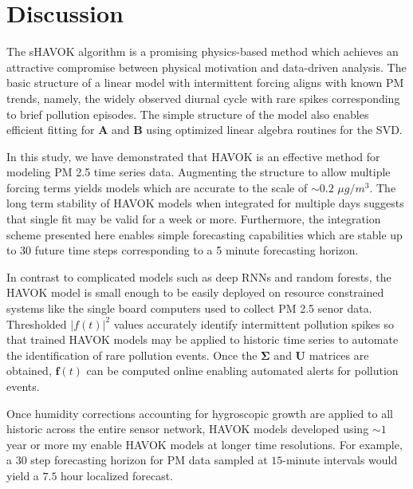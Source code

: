 \section{Discussion}

The sHAVOK algorithm is a promising physics-based method which achieves an
attractive compromise between physical motivation and data-driven analysis.
The basic structure of a linear model with intermittent
forcing aligns with known PM trends, namely, the widely observed diurnal cycle
with rare spikes corresponding to brief pollution episodes. The simple structure
of the model also enables efficient fitting for $\mathbf{A}$ and $\mathbf{B}$
using optimized linear algebra routines for the SVD.

In this study, we have demonstrated that HAVOK is an effective method for
modeling PM 2.5 time series data. Augmenting the structure to allow multiple
forcing terms yields models which are accurate to the scale of $\sim
0.2$ $\mu g/m^3$. The long term stability of HAVOK models when integrated for multiple
days suggests that single fit may be valid for a week or more. Furthermore, the
integration scheme presented here enables simple forecasting capabilities which
are stable up to 30 future time steps corresponding to a 5 minute forecasting
horizon.

In contrast to complicated models such as deep RNNs and random forests, the
HAVOK model is small enough to be easily deployed on resource constrained
systems like the single board computers used to collect PM 2.5 senor data.
Thresholded $\lvert  f(t) \rvert^2$ values accurately identify intermittent
pollution spikes so that trained HAVOK models may be applied to historic
time series to automate the identification of rare pollution events. Once the
$\mathbf{\Sigma}$ and $\mathbf{U}$ matrices are obtained, $\mathbf{f}(t)$
can be computed online enabling automated alerts for pollution events.

Once humidity corrections accounting for hygroscopic growth are applied to all
historic across the entire sensor network, HAVOK models developed using $\sim$$1$
year or more my enable HAVOK models at longer time resolutions. For example, a
30 step forecasting horizon for PM data sampled at $15$-minute intervals would
yield a $7.5$ hour localized forecast.

